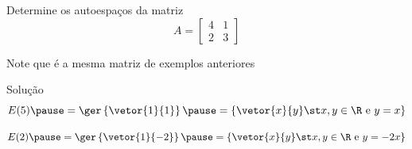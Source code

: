 \begin{question}
  Determine os autoespaços da matriz
  \[
    A =
    \begin{bmatrix}
      4 & 1 \\
      2 & 3
    \end{bmatrix}
  \]

  \bigskip
  Note que é a mesma matriz de exemplos anteriores
\end{question}

\begin{resolution}{Solução}
  \[
    E(5)
    \pause
    = \ger \left\{ \vetor{1}{1} \right\}
    \pause
    = \left\{
        \vetor{x}{y}
        \st
        x, y \in \R \text{ e }
        y = x
      \right\}
  \]

  \pause
  \bigskip
  \[
    E(2)
    \pause
    = \ger \left\{ \vetor{1}{-2} \right\}
    \pause
    = \left\{
        \vetor{x}{y}
        \st
        x, y \in \R \text{ e }
        y = -2x
      \right\}
  \]
\end{resolution}

\endinput
